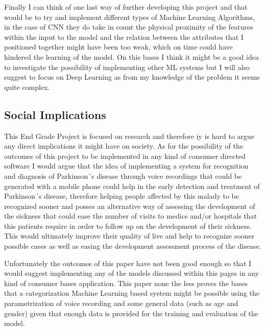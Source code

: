 \documentclass[12pt, a4paper]{article}
\begin{document}
	Finally I can think of one last way of further developing this project and that would be to try and implement different types of Machine Learning Algorithms, in the case of CNN they do take in count the physical proximity of the features within the input to the model and the relation between the attributes that I positioned together might have been too weak, which on time could have hindered the learning of the model. On this bases I think it might be a good idea to investigate the possibility of implementing other ML systems but I will also suggest to focus on Deep Learning as from my knowledge of the problem it seems quite complex.
	
	\clearpage
	
	\subsection{Social Implications}
	
	This End Grade Project is focused on research and therefore iy is hard to argue any direct implications it might have on society. As for the possibility of the outcomes of this project to be implemented in any kind of consumer directed software I would argue that the idea of implementing a system for recognition and diagnosis of Parkinson´s disease through voice recordings that could be generated with a mobile phone could help in the early detection and treatment of Parkinson´s disease, therefore helping people affected by this malady to be recognized sooner and posses an alternative way of assessing the development of the sickness that could ease the number of visits to medics and/or hospitals that this patients require in order to follow up on the development of their sickness. This would ultimately improve their quality of live and help to recognize sooner possible cases as well as easing the development assessment process of the disease.
	
	Unfortunately the outcomes of this paper have not been good enough so that I would suggest implementing any of the models discussed within this pages in any kind of consumer bases application. This paper none the less proves the bases that a categorization Machine Learning based system might be possible using the parametrization of voice recording and some general data (such as age and gender) given that enough data is provided for the training and evaluation of the model.
	
	\clearpage
	
	
	
	
	
	
	
\end{document}
